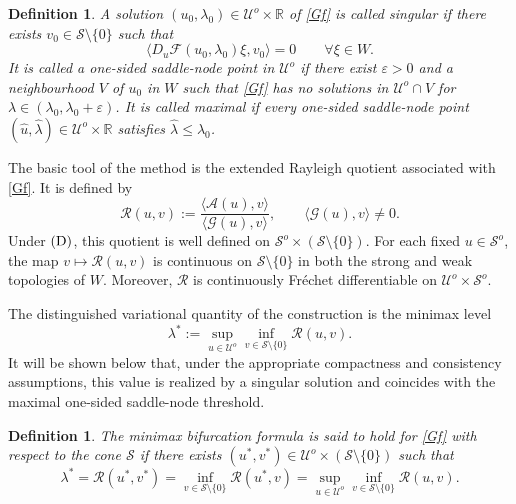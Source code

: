 \documentclass[preprint,10pt]{elsarticle}
\numberwithin{equation}{section}
\newtheorem{defi}[thm]{Definition}
\begin{document}
\begin{defi}
	A solution \((u_0,\lambda_0)\in\mathcal U^o\times\mathbb R\) of
	\eqref{Gf} is called \emph{singular} if there exists
	\(v_0\in\mathcal S\setminus\{0\}\) such that
	\[
	\bigl\langle D_u\mathcal F(u_0,\lambda_0)\xi,v_0\bigr\rangle=0
	\qquad \forall \xi\in W .
	\]
	It is called a \emph{one-sided saddle-node point} in \(\mathcal U^o\) if
	there exist \(\varepsilon>0\) and a neighbourhood \(V\) of \(u_0\) in \(W\)
	such that \eqref{Gf} has no solutions in \(\mathcal U^o\cap V\) for
	\(\lambda\in(\lambda_0,\lambda_0+\varepsilon)\). It is called
	\emph{maximal} if every one-sided saddle-node point
	\((\hat u,\hat\lambda)\in\mathcal U^o\times\mathbb R\) satisfies
	\(\hat\lambda\le\lambda_0\).
\end{defi}

The basic tool of the method is the extended Rayleigh quotient associated with
\eqref{Gf}. It is defined by
\[
\mathcal R(u,v):=
\frac{\langle\mathcal A(u),v\rangle}
{\langle\mathcal G(u),v\rangle},
\qquad
\langle\mathcal G(u),v\rangle\neq0 .
\]
Under \({\rm (D)}\), this quotient is well defined on
\(\mathcal S^o\times(\mathcal S\setminus\{0\})\). For each fixed
\(u\in\mathcal S^o\), the map \(v\mapsto\mathcal R(u,v)\) is continuous on
\(\mathcal S\setminus\{0\}\) in both the strong and weak topologies of \(W\).
Moreover, \(\mathcal R\) is continuously Fr\'echet differentiable on
\(\mathcal U^o\times\mathcal S^o\).

The distinguished variational quantity of the construction is the minimax level
\begin{equation}\label{eq:lambda-star}
	\lambda^*
	:=
	\sup_{u\in\mathcal U^o}
	\inf_{v\in\mathcal S\setminus\{0\}}
	\mathcal R(u,v).
\end{equation}
It will be shown below that, under the appropriate compactness and consistency
assumptions, this value is realized by a singular solution and coincides with
the maximal one-sided saddle-node threshold.

\begin{defi}
	The \emph{minimax bifurcation formula} is said to hold for \eqref{Gf}
	with respect to the cone \(\mathcal S\) if there exists
	\((u^*,v^*)\in\mathcal U^o\times(\mathcal S\setminus\{0\})\) such that
	\begin{equation}\label{MBFDefi}
		\lambda^*
		=
		\mathcal R(u^*,v^*)
		=
		\inf_{v\in\mathcal S\setminus\{0\}}\mathcal R(u^*,v)
		=
		\sup_{u\in\mathcal U^o}
		\inf_{v\in\mathcal S\setminus\{0\}}
		\mathcal R(u,v).
	\end{equation}
\end{defi}
\end{document}
